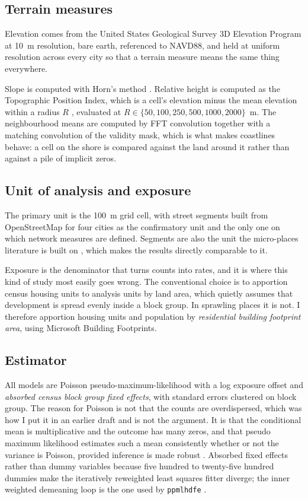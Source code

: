 \documentclass[11pt,letterpaper]{article}
\begin{document}
\subsection{Terrain measures}

Elevation comes from the United States Geological Survey 3D Elevation Program at
10~m resolution, bare earth, referenced to NAVD88, and held at uniform resolution
across every city so that a terrain measure means the same thing everywhere.

Slope is computed with Horn's method \cite{horn1981}. Relative height is computed as the Topographic
Position Index, which is a cell's elevation minus the mean elevation within a radius
$R$ \cite{weiss2001}, evaluated at $R \in \{50, 100, 250, 500, 1000, 2000\}$~m. The
neighbourhood means are computed by FFT convolution together with a matching
convolution of the validity mask, which is what makes coastlines behave: a cell on
the shore is compared against the land around it rather than against a pile of
implicit zeros.

\subsection{Unit of analysis and exposure}

The primary unit is the 100~m grid cell, with street segments built from OpenStreetMap
for four cities as the confirmatory unit and the only one on which network measures
are defined. Segments are also the unit the micro-places literature is built on
\cite{weisburd2015}, which makes the results directly comparable to it.

Exposure is the denominator that turns counts into rates, and it is where this kind
of study most easily goes wrong. The conventional choice is to apportion census
housing units to analysis units by land area, which quietly assumes that development
is spread evenly inside a block group. In sprawling places it is not. I therefore
apportion housing units and population by \emph{residential building footprint area},
using Microsoft Building Footprints.

\subsection{Estimator}

All models are Poisson pseudo-maximum-likelihood with a log exposure offset and
\emph{absorbed census block group fixed effects}, with standard errors clustered on
block group. The reason for Poisson is not that the counts are overdispersed, which
was how I put it in an earlier draft and is not the argument. It is that the
conditional mean is multiplicative and the outcome has many zeros, and that pseudo
maximum likelihood estimates such a mean consistently whether or not the variance is
Poisson, provided inference is made robust \cite{silva2006}. Absorbed fixed effects
rather than dummy variables because five hundred to twenty-five hundred dummies make
the iteratively reweighted least squares fitter diverge; the inner weighted
demeaning loop is the one used by \texttt{ppmlhdfe} \cite{correia2020}.
\end{document}
